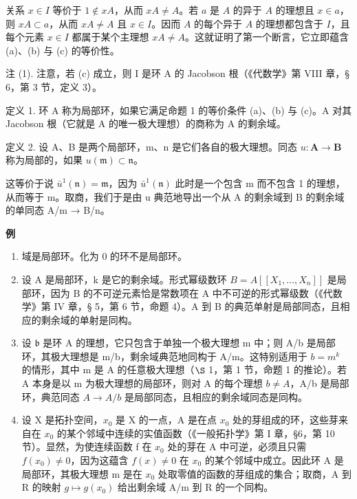 关系 \(x \in I\) 等价于 \(1 \notin xA\)，从而 \(xA \neq A\)。若 \(a\) 是 \(A\) 的异于 \(A\) 的理想且 \(x \in a\)，则 \(xA \subset a\)，从而 \(xA \neq A\) 且 \(x \in I\)。因而 \(A\) 的每个异于 \(A\) 的理想都包含于 \(I\)，且每个元素 \(x \in I\) 都属于某个主理想 \(xA \neq A\)。这就证明了第一个断言，它立即蕴含 (a)、(b) 与 (c) 的等价性。

注 (1). 注意，若 (c) 成立，则 I 是环 A 的 Jacobson 根（《代数学》第 VIII 章，§ 6，第 3 节，定义 3）。

定义 1. 环 A 称为局部环，如果它满足命题 1 的等价条件 (a)、(b) 与 (c)。A 对其 Jacobson 根（它就是 A 的唯一极大理想）的商称为 A 的剩余域。

定义 2. 设 A、B 是两个局部环，m、n 是它们各自的极大理想。同态 \(u: \mathbf{A} \to \mathbf{B}\) 称为局部的，如果 \(u(\mathfrak{m}) \subset \mathfrak{n}\)。

这等价于说 \(\bar{u}^{1}(\mathfrak{n}) = \mathfrak{m}\)，因为 \(\bar{u}^{1}(\mathfrak{n})\) 此时是一个包含 m 而不包含 1 的理想，从而等于 m。取商，我们于是由 u 典范地导出一个从 A 的剩余域到 B 的剩余域的单同态 A/m → B/n。

\textbf{例}\par

\begin{enumerate}
\def\labelenumi{(\arabic{enumi})}
\item
  域是局部环。化为 0 的环不是局部环。
\item
  设 A 是局部环，k 是它的剩余域。形式幂级数环 \(B = A[[X_{1}, \ldots, X_{n}]]\) 是局部环，因为 B 的不可逆元素恰是常数项在 A 中不可逆的形式幂级数（《代数学》第 IV 章，§ 5，第 6 节，命题 4）。A 到 B 的典范单射是局部同态，且相应的剩余域的单射是同构。
\item
  设 \(\mathfrak{b}\) 是环 A 的理想，它只包含于单独一个极大理想 m 中；则 A/b 是局部环，其极大理想是 m/b，剩余域典范地同构于 A/m。这特别适用于 \(b = m^{k}\) 的情形，其中 m 是 A 的任意极大理想（\(\S\) 1，第 1 节，命题 1 的推论）。若 A 本身是以 m 为极大理想的局部环，则对 A 的每个理想 \(b \neq A\)，A/b 是局部环，典范同态 \(A \to A/b\) 是局部同态，且相应的剩余域同态是同构。
\item
  设 X 是拓扑空间，\(x_{0}\) 是 X 的一点，A 是在点 \(x_{0}\) 处的芽组成的环，这些芽来自在 \(x_{0}\) 的某个邻域中连续的实值函数（《一般拓扑学》第 I 章，§6，第 10 节）。显然，为使连续函数 f 在 \(x_{0}\) 处的芽在 A 中可逆，必须且只需 \(f(x_{0}) \neq 0\)，因为这蕴含 \(f(x) \neq 0\) 在 \(x_{0}\) 的某个邻域中成立。因此环 A 是局部环，其极大理想 m 是在 \(x_{0}\) 处取零值的函数的芽组成的集合；取商，A 到 R 的映射 \(g \mapsto g(x_{0})\) 给出剩余域 A/m 到 R 的一个同构。
\end{enumerate}

